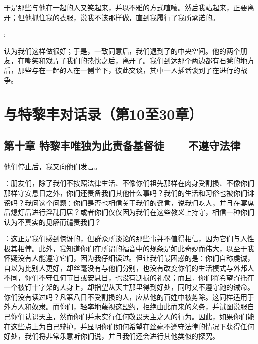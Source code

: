 于是那些与他在一起的人又笑起来，并以不雅的方式喧嚷。然后我站起来，正要离开；但他抓住我的衣服，说我不该那样做，直到我履行了我所承诺的。\par

: \par

认为我们这样做很好；于是，一致同意后，我们退到了的中央空间。他的两个朋友，在嘲笑和戏弄了我们的热忱之后，离开了。我们到达那个两边都有石凳的地方后，那些与在一起的人在一侧坐下，彼此交谈，其中一人插话谈到了在进行的战争。\par



\section{与特黎丰对话录（第10至30章）}


\subsection{第十章 特黎丰唯独为此责备基督徒——不遵守法律}

他们停止后，我又向他们发言。\par

：朋友们，除了我们不按照法律生活、不像你们祖先那样在肉身受割损、不像你们那样守安息日之外，你们还责备我们其他什么事吗？我们的生活和习俗也被你们诽谤吗？我问这个问题：你们是否也相信关于我们的谣言，说我们吃人，并且在宴席后熄灯后进行淫乱同居？或者你们仅仅因为我们在这些教义上持守，相信一种你们认为不真实的见解而谴责我们？\par

：这正是我们感到惊讶的，但群众所谈论的那些事并不值得相信，因为它们与人性极其相悖。此外，我知道你们在所谓的福音中的规条是如此奇妙而伟大，以至于我怀疑没有人能遵守它们，因为我仔细读过。但让我们最困惑的是：你们自称虔诚，自以为比别人更好，却丝毫没有与他们分别，也没有改变你们的生活模式与外邦人不同，你们不守任何节日或安息日，也没有割损的礼仪；而且，你们将希望寄托在一个被钉十字架的人身上，却指望从天主那里得到好处，同时又不遵守祂的诫命。你们没有读过吗？凡第八日不受割损的人，应从他的百姓中被剪除。这同样适用于外方人和奴隶。而你们，轻率地蔑视这盟约，拒绝由此而来的义务，并试图说服自己你们认识天主，然而你们并未实行任何敬畏天主之人的行为。因此，如果你们能在这些点上为自己辩护，并显明你们如何希望在丝毫不遵守法律的情况下获得任何好处，我们将非常乐意听你们说，并且我们还会进行其他类似的探究。\par

